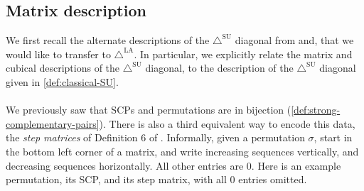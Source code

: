 \documentclass{amsart}
\theoremstyle{definition}
\newcommand{\SUD}{\triangle^{\mathrm{SU}}}
\newcommand{\LAD}{\triangle^{\mathrm{LA}}}
\begin{document}

\subsection{Matrix description}

We first recall the alternate descriptions of the $\SUD$ diagonal from \cite{SaneblidzeUmble} and\cite{SaneblidzeUmble-comparingDiagonals}, that we would like to transfer to $\LAD$. 
In particular, we explicitly relate the matrix and cubical descriptions of the $\SUD$ diagonal, to the description of the $\SUD$ diagonal given in \cref{def:classical-SU}.
\\\\
We previously saw that SCPs and permutations are in bijection (\cref{def:strong-complementary-pairs}). 
There is also a third equivalent way to encode this data, the \emph{step matrices} of Definition 6 of \cite{SaneblidzeUmble}.
Informally, given a permutation $\sigma$, start in the bottom left corner of a matrix, and write increasing sequences vertically, and decreasing sequences horizontally. All other entries are $0$. Here is an example permutation, its SCP, and its step matrix, with all $0$ entries omitted.
{\small
\begin{center}
$\quad \quad$
$\quad \quad$
\end{center}
}
\end{document}
